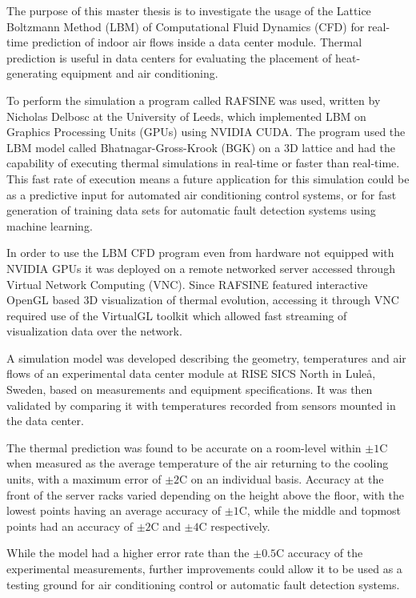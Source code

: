 The purpose of this master thesis is to investigate the usage of the Lattice Boltzmann Method (LBM) of Computational Fluid Dynamics (CFD) for real-time prediction of indoor air flows inside a data center module. Thermal prediction is useful in data centers for evaluating the placement of heat-generating equipment and air conditioning. 

To perform the simulation a program called RAFSINE was used, written by Nicholas Delbosc at the University of Leeds, which implemented LBM on Graphics Processing Units (GPUs) using NVIDIA CUDA. The program used the LBM model called Bhatnagar-Gross-Krook (BGK) on a 3D lattice and had the capability of executing thermal simulations in real-time or faster than real-time. This fast rate of execution means a future application for this simulation could be as a predictive input for automated air conditioning control systems, or for fast generation of training data sets for automatic fault detection systems using machine learning.

In order to use the LBM CFD program even from hardware not equipped with NVIDIA GPUs it was deployed on a remote networked server accessed through Virtual Network Computing (VNC). Since RAFSINE featured interactive OpenGL based 3D visualization of thermal evolution, accessing it through VNC required use of the VirtualGL toolkit which allowed fast streaming of visualization data over the network.

A simulation model was developed describing the geometry, temperatures and air flows of an experimental data center module at RISE SICS North in Lule\r{a}, Sweden, based on measurements and equipment specifications. It was then validated by comparing it with temperatures recorded from sensors mounted in the data center. 

The thermal prediction was found to be accurate on a room-level within $\pm 1$\degree C when measured as the average temperature of the air returning to the cooling units, with a maximum error of $\pm 2$\degree C on an individual basis. Accuracy at the front of the server racks varied depending on the height above the floor, with the lowest points having an average accuracy of $\pm 1$\degree C, while the middle and topmost points had an accuracy of $\pm 2$\degree C and $\pm 4$\degree C respectively. 

While the model had a higher error rate than the $\pm 0.5$\degree C accuracy of the experimental measurements, further improvements could allow it to be used as a testing ground for air conditioning control or automatic fault detection systems.
